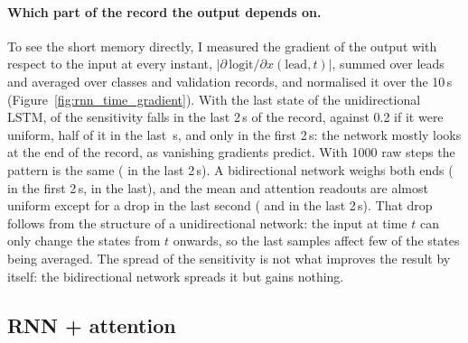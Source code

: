 

\paragraph{Which part of the record the output depends on.} To see the short memory directly, I
measured the gradient of the output with respect to the input at every instant, $|\partial\,
\mathrm{logit}/\partial x(\text{lead}, t)|$, summed over leads and averaged over classes and
\rnnSensNRecords{} validation records, and normalised it over the 10\,s
(Figure~\ref{fig:rnn_time_gradient}). With the last state of the unidirectional LSTM,
\rnnSensLastBase{} of the sensitivity falls in the last 2\,s of the record, against 0.2 if it were
uniform, half of it in the last \rnnSensHalfWindowSBase\,s, and only \rnnSensFirstBase{} in the first
2\,s: the network mostly looks at the end of the record, as vanishing gradients predict. With 1000 raw
steps the pattern is the same (\rnnSensLastRaw{} in the last 2\,s). A bidirectional network weighs both
ends (\rnnSensFirstBi{} in the first 2\,s, \rnnSensLastBi{} in the last), and the mean and attention
readouts are almost uniform except for a drop in the last second (\rnnSensLastMean{} and
\rnnSensLastAttn{} in the last 2\,s). That drop follows from the structure of a unidirectional network:
the input at time $t$ can only change the states from $t$ onwards, so the last samples affect few of the
states being averaged. The spread of the sensitivity is not what improves the result by itself: the
bidirectional network spreads it but gains nothing.



\subsection{RNN + attention}\label{sec:rnn-attn}

